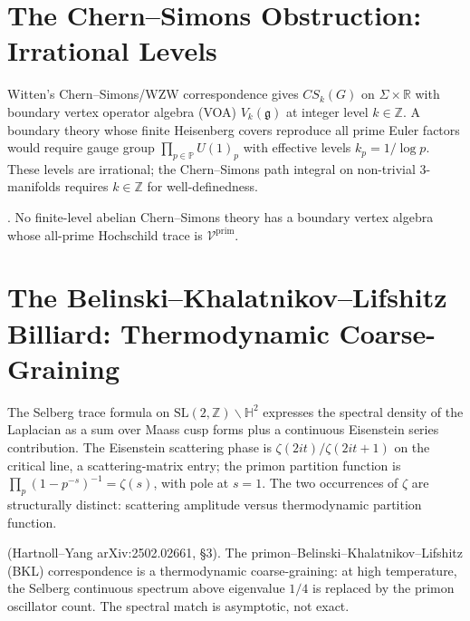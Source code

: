 \section{The Chern--Simons Obstruction: Irrational Levels}
\label{v4-arith:wit:3D-CS-fails}

\begin{observation}
\label{v4-arith:obs:non-integer-level}
Witten's Chern--Simons/WZW correspondence gives \(CS_{k}(G)\) on
\(\Sigma\times\mathbb{R}\) with boundary vertex operator algebra (VOA)
\(V_{k}(\mathfrak{g})\) at integer level \(k\in\mathbb{Z}\). A
boundary theory whose finite Heisenberg covers reproduce all prime
Euler factors would require gauge group
\(\prod_{p\in\mathbb{P}}U(1)_{p}\) with effective levels
\(k_{p}=1/\log p\). These levels are irrational; the Chern--Simons path
integral on non-trivial 3-manifolds requires \(k\in\mathbb{Z}\) for
well-definedness.
\end{observation}

\begin{corollary}
\label{v4-arith:cor:no-CS-VOA-arith}
\ClaimStatusProvedHere. No finite-level abelian Chern--Simons theory
has a boundary vertex algebra whose all-prime Hochschild trace is
\(\mathcal{V}^{\mathrm{prim}}\).
\end{corollary}

\section{The Belinski--Khalatnikov--Lifshitz Billiard: Thermodynamic Coarse-Graining}
\label{v4-arith:wit:BKL-coarse-graining}

\begin{observation}
\label{v4-arith:obs:selberg-vs-primon}
The Selberg trace formula on \(\mathrm{SL}(2,\mathbb{Z})\backslash\mathbb{H}^{2}\)
expresses the spectral density of the Laplacian as a sum over Maass
cusp forms plus a continuous Eisenstein series contribution. The
Eisenstein scattering phase is \(\zeta(2it)/\zeta(2it+1)\) on the
critical line, a scattering-matrix entry; the primon partition function
is \(\prod_{p}(1-p^{-s})^{-1}=\zeta(s)\), with pole at \(s=1\). The
two occurrences of \(\zeta\) are structurally distinct: scattering
amplitude versus thermodynamic partition function.
\end{observation}

\begin{theorem}
\label{v4-arith:thm:HY-coarse-graining}
\ClaimStatusProvedElsewhere (Hartnoll--Yang arXiv:2502.02661,
\S3). The primon--Belinski--Khalatnikov--Lifshitz (BKL) correspondence
is a thermodynamic coarse-graining: at high temperature, the Selberg
continuous spectrum above eigenvalue \(1/4\) is replaced by the
primon oscillator count. The spectral match is asymptotic, not exact.
\end{theorem}


